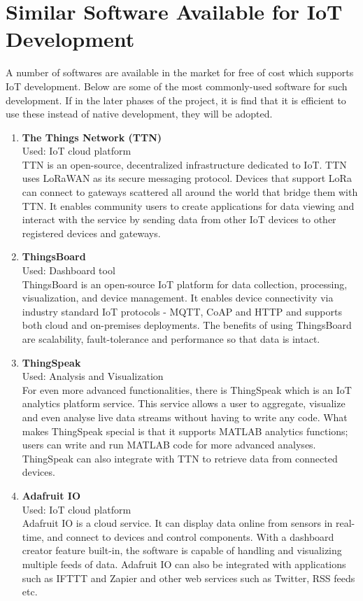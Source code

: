 \chapter{Similar Software Available for IoT Development}

A number of softwares are available in the market for free of cost which supports IoT development. Below are some of the most commonly-used software for such development. If in the later phases of the project, it is find that it is efficient to use these instead of native development, they will be adopted.

\begin{enumerate}
    \item \textbf{The Things Network (TTN)}\\
	Used: IoT cloud platform\\
TTN is an open-source, decentralized infrastructure dedicated to IoT. TTN uses LoRaWAN as its secure messaging protocol. Devices that support LoRa can connect to gateways scattered all around the world that bridge them with TTN. It enables community users to create applications for data viewing and interact with the service by sending data from other IoT devices to other registered devices and gateways.

\item \textbf{ThingsBoard}\\
	Used: Dashboard tool\\
ThingsBoard is an open-source IoT platform for data collection, processing, visualization, and device management. It enables device connectivity via industry standard IoT protocols - MQTT, CoAP and HTTP and supports both cloud and on-premises deployments. The benefits of using ThingsBoard are scalability, fault-tolerance and performance so that data is intact. \cite{39}

\item \textbf{ThingSpeak}\\
Used: Analysis and Visualization\\
For even more advanced functionalities, there is ThingSpeak which is an IoT analytics platform service. This service allows a user to aggregate, visualize and even analyse live data streams without having to write any code. What makes ThingSpeak special is that it supports MATLAB analytics functions; users can write and run MATLAB code for more advanced analyses. ThingSpeak can also integrate with TTN to retrieve data from connected devices. \cite{40}

\item \textbf{Adafruit IO}\\
Used: IoT cloud platform\\
Adafruit IO is a cloud service. It can display data online from sensors in real-time, and connect to devices and control components. With a dashboard creator feature built-in, the software is capable of handling and visualizing multiple feeds of data. Adafruit IO can also be integrated with applications such as IFTTT and Zapier and other web services such as Twitter, RSS feeds etc. \cite{41}
\end{enumerate}